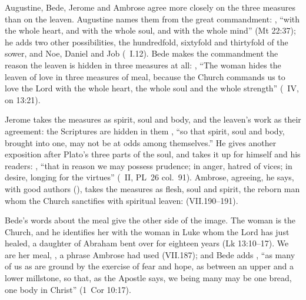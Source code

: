 Augustine, Bede, Jerome and Ambrose agree more closely on the three measures
than on the leaven. Augustine names them from the great commandment:
, ``with the whole
heart, and with the whole soul, and with the whole mind'' (Mt 22:37); he adds
two other possibilities, the hundredfold, sixtyfold and thirtyfold of the
sower, and Noe, Daniel and Job (~I.12). Bede
makes the commandment the reason the leaven is hidden in three measures at
all: , ``The woman hides the leaven of love in three measures of meal,
because the Church commands us to love the Lord with the whole heart, the
whole soul and the whole strength'' (~IV, on 13:21).

Jerome takes the measures as spirit, soul and body, and the leaven's work as
their agreement: the Scriptures are hidden in them , ``so that spirit, soul
and body, brought into one, may not be at odds among themselves.'' He gives
another exposition after Plato's three parts of the soul, and takes it up for
himself and his readers: , ``that in reason we
may possess prudence; in anger, hatred of vices; in desire, longing for the
virtues'' (~II, PL~26 col.~91). Ambrose, agreeing, he says,
with good authors (), takes the measures
as flesh, soul and spirit, the reborn man whom the Church sanctifies with
spiritual leaven:  (VII.190--191).

Bede's words about the meal give the other side of the image. The woman is
the Church, and he identifies her with the woman in Luke whom the Lord has
just healed, a daughter of Abraham bent over for eighteen years (Lk
13:10--17). We are her meal, , a phrase Ambrose
had used (VII.187); and Bede adds , ``as many of us as are ground by the
exercise of fear and hope, as between an upper and a lower millstone, so that,
as the Apostle says, we being many may be one bread, one body in Christ''
(1~Cor 10:17).

